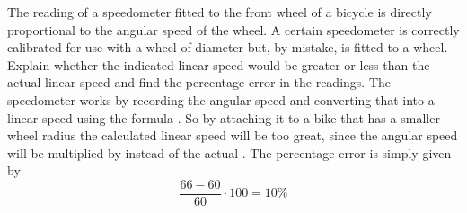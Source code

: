 

\begin{problem}[A1984PIQ1l]
{The reading of a speedometer fitted to the front wheel of a bicycle is directly proportional to the angular speed of the wheel. A certain speedometer is correctly calibrated for use with a wheel of diameter  but, by mistake, is fitted to a  wheel. Explain whether the indicated linear speed would be greater or less than the actual linear speed and find the percentage error in the readings.
} 
{}
{The speedometer works by recording the angular speed \vari{\omega} and converting that into a linear speed using the formula . So by attaching it to a bike that has a smaller wheel radius the calculated linear speed will be too great, since the angular speed will be multiplied by  instead of the actual . The percentage error is simply given by 
\begin{equation*} \frac{66-60}{60}\cdot100=10\% \end{equation*}
}
\end{problem}